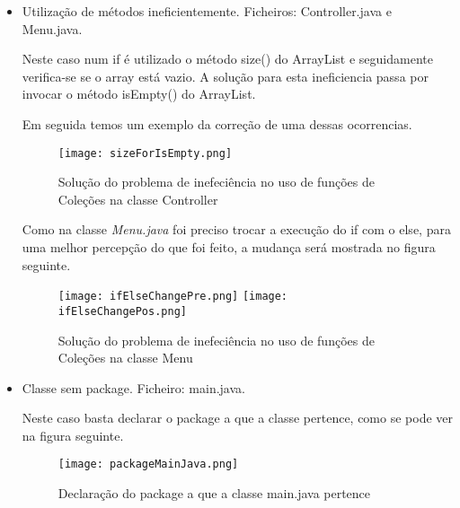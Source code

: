 \begin{itemize}
\item Utilização de métodos ineficientemente.\newline
 Ficheiros: Controller.java e Menu.java.\newline


\par Neste caso num if é utilizado o método size() do ArrayList e seguidamente verifica-se se o array está vazio. A solução para esta ineficiencia passa por invocar o método isEmpty() do ArrayList.\newline
\par Em seguida temos um exemplo da correção de uma dessas ocorrencias. 
\begin{figure}[H]

  \centering

  \texttt{[image: sizeForIsEmpty.png]}

  \caption {Solução do problema de inefeciência no uso de funções de Coleções na classe Controller}

  \label {fig16}

\end{figure}


\par Como na classe \textit{Menu.java} foi preciso trocar a execução do if com o else, para uma melhor percepção do que foi feito, a mudança será mostrada no figura seguinte.

\begin{figure}[H]

  \centering

  \texttt{[image: ifElseChangePre.png]}
  \texttt{[image: ifElseChangePos.png]}

  \caption {Solução do problema de inefeciência no uso de funções de Coleções na classe Menu}

  \label {fig17}

\end{figure}

\end{itemize}

\begin{itemize}
\item Classe sem package.\newline
 Ficheiro: main.java.\newline


\par Neste caso basta declarar o package a que a classe pertence, como se pode ver na figura seguinte.\newline 

\begin{figure}[H]

  \centering

  \texttt{[image: packageMainJava.png]}

  \caption {Declaração do package a que a classe main.java pertence}

  \label {fig18}

\end{figure}

\end{itemize}


